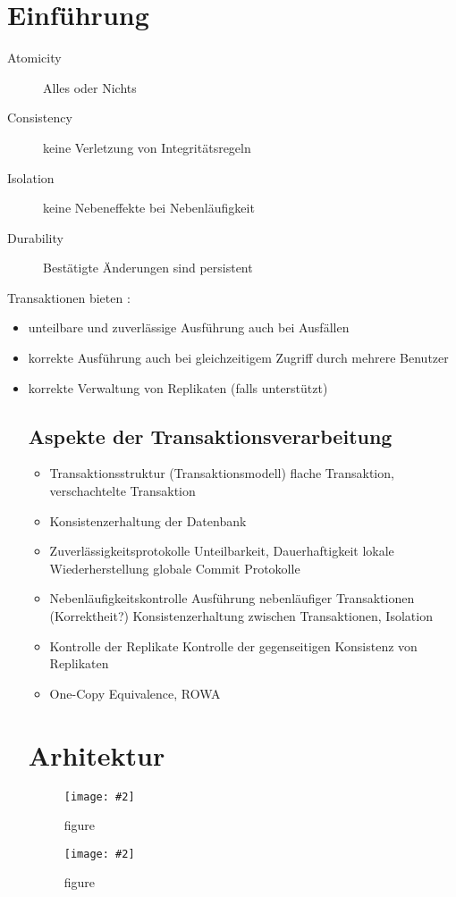 \documentclass[a4paper,10pt,titlepage=false]{scrreprt}
\newcommand{\pic}[2][figure]{\begin{figure}[h]
 \centering
 \texttt{[image: \#2]}
 \caption{#1}
\end{figure}
}
\begin{document}
\section{Einführung}
\begin{description}
\item[Atomicity] Alles oder Nichts
\item[Consistency] keine Verletzung von Integritätsregeln
\item[Isolation] keine Nebeneffekte bei Nebenläufigkeit
\item[Durability] Bestätigte Änderungen sind persistent
\end{description}

Transaktionen bieten :
\begin{itemize}
 \item unteilbare und zuverlässige Ausführung auch bei
Ausfällen
\item korrekte Ausführung auch bei gleichzeitigem Zugriff
durch mehrere Benutzer
\item korrekte Verwaltung von Replikaten (falls unterstützt)

\subsection{Aspekte der Transaktionsverarbeitung}
\begin{itemize}
 \item Transaktionsstruktur (Transaktionsmodell)
\subitem flache Transaktion, verschachtelte Transaktion
\item Konsistenzerhaltung der Datenbank
\item Zuverlässigkeitsprotokolle
\subitem Unteilbarkeit, Dauerhaftigkeit
\subitem lokale Wiederherstellung
\subitem globale Commit Protokolle
\item Nebenläufigkeitskontrolle
\subitem Ausführung nebenläufiger Transaktionen (Korrektheit?)
\subitem Konsistenzerhaltung zwischen Transaktionen, Isolation
\item Kontrolle der Replikate
\subitem Kontrolle der gegenseitigen Konsistenz von Replikaten
\item One-Copy Equivalence, ROWA
\end{itemize}

\section{Arhitektur}
\pic{dbarchcca.png}
\pic{dbarchcc1.png}


\end{itemize}
\end{document}
